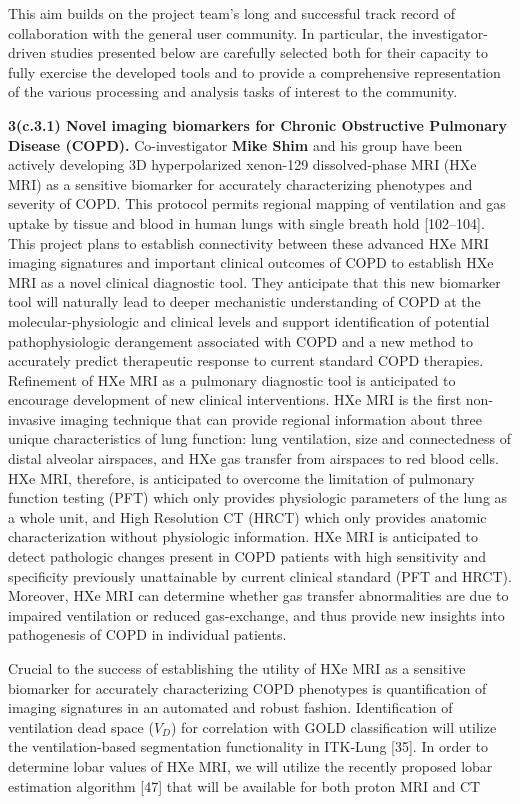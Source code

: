 \documentclass[11pt,]{article}
\begin{document}
This aim builds on the project team's long and successful track record
of collaboration with the general user community. In particular, the
investigator-driven studies presented below are carefully selected both
for their capacity to fully exercise the developed tools and to provide
a comprehensive representation of the various processing and analysis
tasks of interest to the community.

\textbf{3(c.3.1) Novel imaging biomarkers for Chronic Obstructive
Pulmonary Disease (COPD).} Co-investigator \textbf{Mike Shim} and his
group have been actively developing 3D hyperpolarized xenon-129
dissolved-phase MRI (HXe MRI) as a sensitive biomarker for accurately
characterizing phenotypes and severity of COPD. This protocol permits
regional mapping of ventilation and gas uptake by tissue and blood in
human lungs with single breath hold {[}102--104{]}. This project plans
to establish connectivity between these advanced HXe MRI imaging
signatures and important clinical outcomes of COPD to establish HXe MRI
as a novel clinical diagnostic tool. They anticipate that this new
biomarker tool will naturally lead to deeper mechanistic understanding
of COPD at the molecular-physiologic and clinical levels and support
identification of potential pathophysiologic derangement associated with
COPD and a new method to accurately predict therapeutic response to
current standard COPD therapies. Refinement of HXe MRI as a pulmonary
diagnostic tool is anticipated to encourage development of new clinical
interventions. HXe MRI is the first non-invasive imaging technique that
can provide regional information about three unique characteristics of
lung function: lung ventilation, size and connectedness of distal
alveolar airspaces, and HXe gas transfer from airspaces to red blood
cells. HXe MRI, therefore, is anticipated to overcome the limitation of
pulmonary function testing (PFT) which only provides physiologic
parameters of the lung as a whole unit, and High Resolution CT (HRCT)
which only provides anatomic characterization without physiologic
information. HXe MRI is anticipated to detect pathologic changes present
in COPD patients with high sensitivity and specificity previously
unattainable by current clinical standard (PFT and HRCT). Moreover, HXe
MRI can determine whether gas transfer abnormalities are due to impaired
ventilation or reduced gas-exchange, and thus provide new insights into
pathogenesis of COPD in individual patients.

Crucial to the success of establishing the utility of HXe MRI as a
sensitive biomarker for accurately characterizing COPD phenotypes is
quantification of imaging signatures in an automated and robust fashion.
Identification of ventilation dead space ($V_D$) for correlation with
GOLD classification will utilize the ventilation-based segmentation
functionality in ITK-Lung {[}35{]}. In order to determine lobar values
of HXe MRI, we will utilize the recently proposed lobar estimation
algorithm {[}47{]} that will be available for both proton MRI and CT
\end{document}
